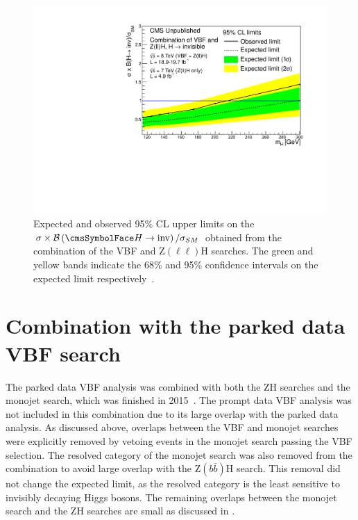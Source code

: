 \begin{figure}
  \includegraphics[width=\largefigwidth]{plots/prompt/HIG-13-30-figs/highmasslimit.pdf}
  \caption[Expected and observed 95\% CL upper limits on the $\sigma\times\BRinv/\sigma_{SM}$ obtained from the combination of the VBF and Z$(\ell\ell)$H searches. The green and yellow bands indicate the 68\% and 95\% confidence intervals on the expected limit respectively.]{Expected and observed 95\% CL upper limits on the $\sigma\times\BRinv/\sigma_{SM}$ obtained from the combination of the VBF and Z$(\ell\ell)$H searches. The green and yellow bands indicate the 68\% and 95\% confidence intervals on the expected limit respectively~\cite{Chatrchyan:2014tja}.}
  \label{fig:promptcombhighmass}
\end{figure}

\section{Combination with the parked data VBF search}
\label{sec:combparked}
The parked data \ac{VBF} analysis was combined with both the ZH searches and the monojet search, which was finished in 2015~\cite{CMS-PAS-HIG-15-012}. The prompt data \ac{VBF} analysis was not included in this combination due to its large overlap with the parked data analysis. As discussed above, overlaps between the \ac{VBF} and monojet searches were explicitly removed by vetoing events in the monojet search passing the \ac{VBF} selection. The resolved category of the monojet search was also removed from the combination to avoid large overlap with the Z$(b\bar{b})$H search. This removal did not change the expected limit, as the resolved category is the least sensitive to invisibly decaying Higgs bosons. The remaining overlaps between the monojet search and the ZH searches are small as discussed in .

